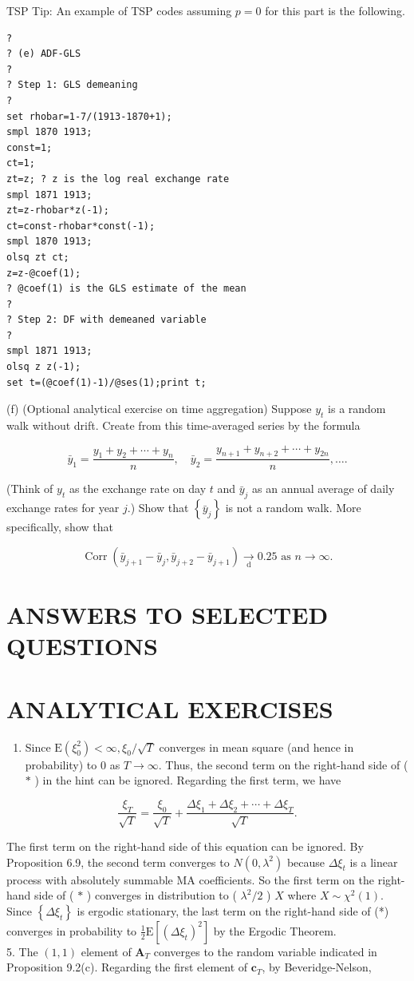 \documentclass[10pt]{article}
\begin{document}
TSP Tip: An example of TSP codes assuming $p=0$ for this part is the following.

\begin{verbatim}
?
? (e) ADF-GLS
?
? Step 1: GLS demeaning
?
set rhobar=1-7/(1913-1870+1);
smpl 1870 1913;
const=1;
ct=1;
zt=z; ? z is the log real exchange rate
smpl 1871 1913;
zt=z-rhobar*z(-1);
ct=const-rhobar*const(-1);
smpl 1870 1913;
olsq zt ct;
z=z-@coef(1);
? @coef(1) is the GLS estimate of the mean
?
? Step 2: DF with demeaned variable
?
smpl 1871 1913;
olsq z z(-1);
set t=(@coef(1)-1)/@ses(1);print t;
\end{verbatim}

(f) (Optional analytical exercise on time aggregation) Suppose $y_{t}$ is a random walk without drift. Create from this time-averaged series by the formula

$$
\bar{y}_{1}=\frac{y_{1}+y_{2}+\cdots+y_{n}}{n}, \quad \bar{y}_{2}=\frac{y_{n+1}+y_{n+2}+\cdots+y_{2 n}}{n}, \ldots .
$$

(Think of $y_{t}$ as the exchange rate on day $t$ and $\bar{y}_{j}$ as an annual average of daily exchange rates for year $j$.) Show that $\left\{\bar{y}_{j}\right\}$ is not a random walk. More specifically, show that

$$
\operatorname{Corr}\left(\bar{y}_{j+1}-\bar{y}_{j}, \bar{y}_{j+2}-\bar{y}_{j+1}\right) \xrightarrow[\mathrm{d}]{ } 0.25 \text { as } n \rightarrow \infty .
$$

\section*{ANSWERS TO SELECTED QUESTIONS}
\section*{ANALYTICAL EXERCISES}
\begin{enumerate}
  \item Since $\mathrm{E}\left(\xi_{0}^{2}\right)<\infty, \xi_{0} / \sqrt{T}$ converges in mean square (and hence in probability) to 0 as $T \rightarrow \infty$. Thus, the second term on the right-hand side of ( $*$ ) in the hint can be ignored. Regarding the first term, we have
\end{enumerate}

$$
\frac{\xi_{T}}{\sqrt{T}}=\frac{\xi_{0}}{\sqrt{T}}+\frac{\Delta \xi_{1}+\Delta \xi_{2}+\cdots+\Delta \xi_{T}}{\sqrt{T}} .
$$

The first term on the right-hand side of this equation can be ignored. By Proposition 6.9, the second term converges to $N\left(0, \lambda^{2}\right)$ because $\Delta \xi_{t}$ is a linear process with absolutely summable MA coefficients. So the first term on the right-hand side of ( $*$ ) converges in distribution to ( $\lambda^{2} / 2$ ) $X$ where $X \sim \chi^{2}(1)$. Since $\left\{\Delta \xi_{t}\right\}$ is ergodic stationary, the last term on the right-hand side of (*) converges in probability to $\frac{1}{2} \mathrm{E}\left[\left(\Delta \xi_{t}\right)^{2}\right]$ by the Ergodic Theorem.\\
5. The $(1,1)$ element of $\mathbf{A}_{T}$ converges to the random variable indicated in Proposition 9.2(c). Regarding the first element of $\mathbf{c}_{T}$, by Beveridge-Nelson,
\end{document}
